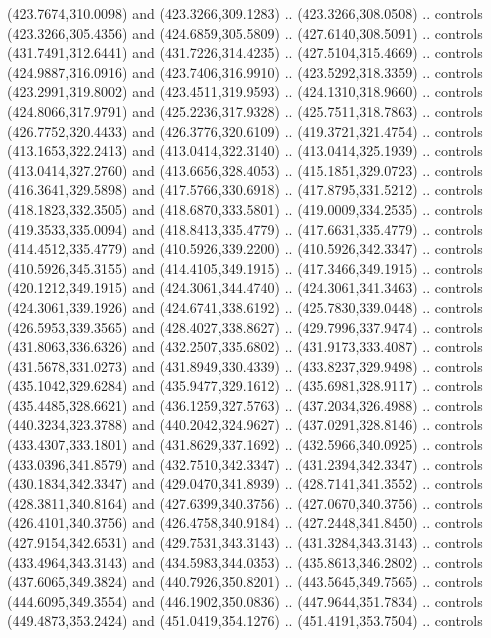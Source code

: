 \begin{scope}[cm={{1.25,0.0,0.0,-1.25,(0.0,743.43331)}}]
    (423.7674,310.0098) and (423.3266,309.1283) .. (423.3266,308.0508) .. controls
    (423.3266,305.4356) and (424.6859,305.5809) .. (427.6140,308.5091) .. controls
    (431.7491,312.6441) and (431.7226,314.4235) .. (427.5104,315.4669) .. controls
    (424.9887,316.0916) and (423.7406,316.9910) .. (423.5292,318.3359) .. controls
    (423.2991,319.8002) and (423.4511,319.9593) .. (424.1310,318.9660) .. controls
    (424.8066,317.9791) and (425.2236,317.9328) .. (425.7511,318.7863) .. controls
    (426.7752,320.4433) and (426.3776,320.6109) .. (419.3721,321.4754) .. controls
    (413.1653,322.2413) and (413.0414,322.3140) .. (413.0414,325.1939) .. controls
    (413.0414,327.2760) and (413.6656,328.4053) .. (415.1851,329.0723) .. controls
    (416.3641,329.5898) and (417.5766,330.6918) .. (417.8795,331.5212) .. controls
    (418.1823,332.3505) and (418.6870,333.5801) .. (419.0009,334.2535) .. controls
    (419.3533,335.0094) and (418.8413,335.4779) .. (417.6631,335.4779) .. controls
    (414.4512,335.4779) and (410.5926,339.2200) .. (410.5926,342.3347) .. controls
    (410.5926,345.3155) and (414.4105,349.1915) .. (417.3466,349.1915) .. controls
    (420.1212,349.1915) and (424.3061,344.4740) .. (424.3061,341.3463) .. controls
    (424.3061,339.1926) and (424.6741,338.6192) .. (425.7830,339.0448) .. controls
    (426.5953,339.3565) and (428.4027,338.8627) .. (429.7996,337.9474) .. controls
    (431.8063,336.6326) and (432.2507,335.6802) .. (431.9173,333.4087) .. controls
    (431.5678,331.0273) and (431.8949,330.4339) .. (433.8237,329.9498) .. controls
    (435.1042,329.6284) and (435.9477,329.1612) .. (435.6981,328.9117) .. controls
    (435.4485,328.6621) and (436.1259,327.5763) .. (437.2034,326.4988) .. controls
    (440.3234,323.3788) and (440.2042,324.9627) .. (437.0291,328.8146) .. controls
    (433.4307,333.1801) and (431.8629,337.1692) .. (432.5966,340.0925) .. controls
    (433.0396,341.8579) and (432.7510,342.3347) .. (431.2394,342.3347) .. controls
    (430.1834,342.3347) and (429.0470,341.8939) .. (428.7141,341.3552) .. controls
    (428.3811,340.8164) and (427.6399,340.3756) .. (427.0670,340.3756) .. controls
    (426.4101,340.3756) and (426.4758,340.9184) .. (427.2448,341.8450) .. controls
    (427.9154,342.6531) and (429.7531,343.3143) .. (431.3284,343.3143) .. controls
    (433.4964,343.3143) and (434.5983,344.0353) .. (435.8613,346.2802) .. controls
    (437.6065,349.3824) and (440.7926,350.8201) .. (443.5645,349.7565) .. controls
    (444.6095,349.3554) and (446.1902,350.0836) .. (447.9644,351.7834) .. controls
    (449.4873,353.2424) and (451.0419,354.1276) .. (451.4191,353.7504) .. controls

\end{scope}
